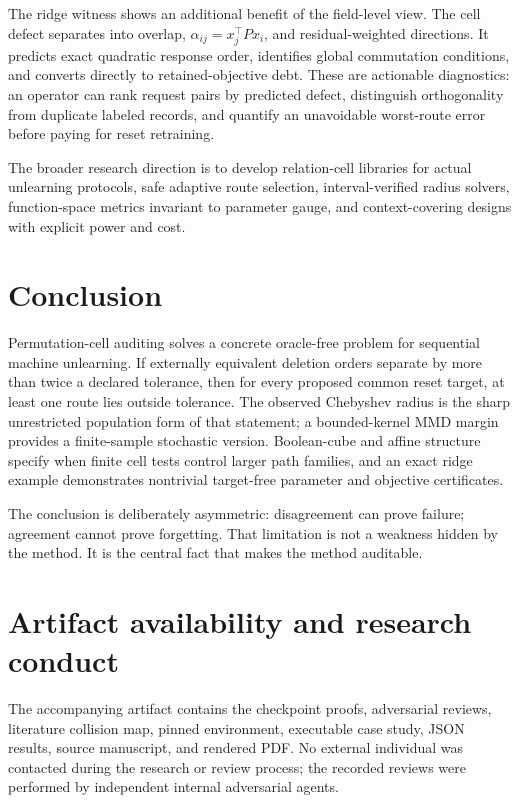 \documentclass[10pt]{article}
\theoremstyle{definition}
\theoremstyle{remark}
\begin{document}
The ridge witness shows an additional benefit of the field-level view. The
cell defect separates into overlap,
\(\alpha_{ij}=x_j^\top Px_i\), and residual-weighted directions. It predicts
exact quadratic response order, identifies global commutation conditions, and
converts directly to retained-objective debt. These are actionable diagnostics:
an operator can rank request pairs by predicted defect, distinguish
orthogonality from duplicate labeled records, and quantify an unavoidable
worst-route error before paying for reset retraining.

The broader research direction is to develop relation-cell libraries for
actual unlearning protocols, safe adaptive route selection, interval-verified
radius solvers, function-space metrics invariant to parameter gauge, and
context-covering designs with explicit power and cost.

\section{Conclusion}

Permutation-cell auditing solves a concrete oracle-free problem for sequential
machine unlearning. If externally equivalent deletion orders separate by more
than twice a declared tolerance, then for every proposed common reset target,
at least one route lies outside tolerance. The observed Chebyshev radius is the
sharp unrestricted
population form of that statement; a bounded-kernel MMD margin provides a
finite-sample stochastic version. Boolean-cube and affine structure specify
when finite cell tests control larger path families, and an exact ridge example
demonstrates nontrivial target-free parameter and objective certificates.

The conclusion is deliberately asymmetric: disagreement can prove failure;
agreement cannot prove forgetting. That limitation is not a weakness hidden by
the method. It is the central fact that makes the method auditable.

\section*{Artifact availability and research conduct}

The accompanying artifact contains the checkpoint proofs, adversarial reviews,
literature collision map, pinned environment, executable case study, JSON
results, source manuscript, and rendered PDF. No external individual was
contacted during the research or review process; the recorded reviews were
performed by independent internal adversarial agents.



\end{document}
